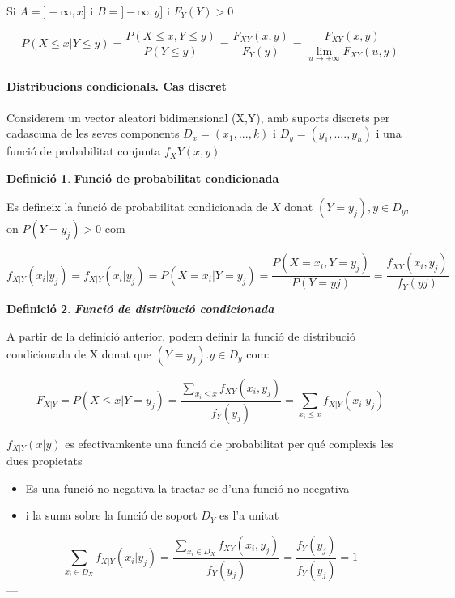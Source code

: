 \documentclass[
  catalan,
]{article}
\providecommand{\tightlist}{%
  \setlength{\itemsep}{0pt}\setlength{\parskip}{0pt}}
\theoremstyle{definition}
\newtheorem{definition}{Definició}[section]
\theoremstyle{definition}
\theoremstyle{definition}
\theoremstyle{definition}
\theoremstyle{remark}
\begin{document}
Si \(A=] - \infty, x]\) i \(B=]- \infty ,y]\) i \(F_Y(Y)>0\)

\[
P(X \leq x | Y \leq y)= \frac {P(X \leq x, Y\leq y)}{ P(Y \leq y)} =\frac {F_{XY}(x,y)}{F_Y(y)}=
\frac {F_{XY}(x,y)}{\lim_{u \rightarrow +\infty } F_{XY}(u,y)} 
\]

\paragraph{Distribucions condicionals. Cas discret}\label{distribucions-condicionals.-cas-discret}

Considerem un vector aleatori bidimensional (X,Y), amb suports discrets per cadascuna de les seves components \(D_x=(x_1, ...,k)\) i \(D_y=(y_1,....,y_h)\) i una funció de probabilitat conjunta \(f_XY(x,y)\)

\begin{definition}
\textbf{Funció de probabilitat condicionada}

Es defineix la funció de probabilitat condicionada de \(X\) donat \((Y=y_j),  y \in D_y\), on \(P(Y=y_j)>0\) com

\[
f_{X|Y} (x_i| y_j)=f_{X|Y}(x_i|y_j)=P(X=x_i | Y=y_j)=\frac {P(X=x_i, Y=y_j)}{P(Y=yj)}=\frac {f_{XY}(x_i,y_j)}{f_Y(yj)}
\]
\end{definition}

\begin{definition}
\textbf{\emph{Funció de distribució condicionada}}

A partir de la definició anterior, podem definir la funció de distribució condicionada de X donat que \((Y=y_j). y \in D_y\) com:

\[
F_{X|Y}= P(X \leq x| Y=y_j) =\frac{ \sum_{x_i \leq x } f_{XY}(x_i,y_j)}  {f_Y(y_j)}=\sum_{x_i \leq x } f_{X|Y}(x_i|y_j) 
\]
\end{definition}

\(f_{X|Y}(x|y)\) es efectivamkente una funció de probabilitat per qué complexis les dues propietats

\begin{itemize}
\tightlist
\item
  Es una funció no negativa la tractar-se d'una funció no neegativa
\item
  i la suma sobre la funció de soport \(D_Y\) es l'a unitat
\end{itemize}

\[
\sum_{x_i \in D_X} f_{X|Y}(x_i|y_j)= \frac{ \sum_{x_i \in D_X } f_{XY}(x_i,y_j)}  {f_Y(y_j)}=\frac  {f_Y(y_j)} {f_Y(y_j)}=1
\]
---
\end{document}
